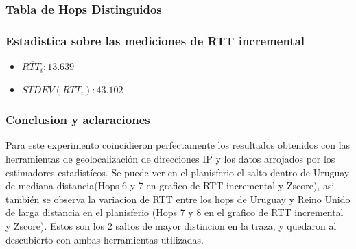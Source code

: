 \subsubsection{Tabla de Hops Distinguidos}
\begin{center}
\end{center}

\subsubsection{Estadistica sobre las mediciones de RTT incremental}
\begin{itemize}
	\item $\overline{RTT_i}: 13.639$
	\item $STDEV(RTT_i): 43.102$
\end{itemize}

\subsubsection{Conclusion y aclaraciones}
Para este experimento coincidieron perfectamente los resultados obtenidos con las herramientas de geolocalización de direcciones IP y los datos arrojados por los estimadores estadistícos. Se puede ver en el planisferio el salto dentro de Uruguay de mediana distancia(Hops 6 y 7 en grafico de RTT incremental y Zscore), asi también se observa la variacion de RTT entre los hops de Uruguay y Reino Unido de larga distancia en el planisferio (Hops 7 y 8 en el grafico de RTT incremental y Zscore). Estos son los 2 saltos de mayor distincion en la traza, y quedaron al descubierto con ambas herramientas utilizadas.
